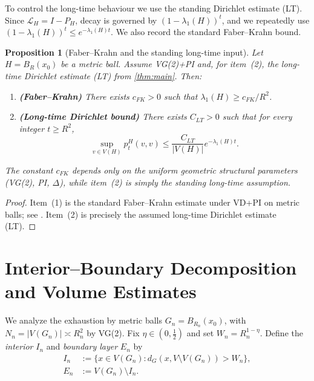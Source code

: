 \documentclass[reqno]{amsart}
\numberwithin{equation}{section}
\newtheorem{proposition}[proposition]{Proposition}
\theoremstyle{definition}
\theoremstyle{remark}
\newcommand{\Cref}[1]{\autoref{#1}}
\newcommand{\LL}{\mathcal{L}}
\begin{document}
To control the long-time behaviour we use the standing Dirichlet estimate (LT). Since $\LL_H=I-P_H$, decay is governed by $(1-\lambda_1(H))^t$, and we repeatedly use $(1-\lambda_1(H))^t\le e^{-\lambda_1(H)t}$. We also record the standard Faber--Krahn bound.

\begin{proposition}[Faber--Krahn and the standing long-time input]\label{prop:LT}
Let $H=B_R(x_0)$ be a metric ball. Assume VG(2)+PI and, for item~\textup{(2)}, the long-time Dirichlet estimate \textup{(LT)} from \Cref{thm:main}. Then:
\begin{enumerate}
    \item \textbf{(Faber--Krahn)} There exists $c_{FK}>0$ such that $\lambda_1(H)\ge c_{FK}/R^{2}$.
    \item \textbf{(Long-time Dirichlet bound)} There exists $C_{LT}>0$ such that for every integer $t\ge R^{2}$,
    \begin{equation}\label{eq:LT}
        \sup_{v \in V(H)} p_t^H(v,v) \leq \frac{C_{LT}}{|V(H)|} e^{-\lambda_1(H) t}.
    \end{equation}
\end{enumerate}
The constant $c_{FK}$ depends only on the uniform geometric structural parameters \textup{(VG(2), PI,} $\Delta$), while item~\textup{(2)} is simply the standing long-time assumption.
\end{proposition}

\begin{proof}
Item~(1) is the standard Faber--Krahn estimate under VD+PI on metric balls; see \cite{Grigoryan09, BarlowBass04}. Item~(2) is precisely the assumed long-time Dirichlet estimate (LT).
\end{proof}

\section{Interior--Boundary Decomposition and Volume Estimates}\label{sec:decomposition}

We analyze the exhaustion by metric balls $G_n = B_{R_n}(x_0)$, with $N_n = |V(G_n)|\asymp R_n^2$ by VG(2). Fix $\eta \in (0, \tfrac{1}{2})$ and set $W_n = R_n^{1-\eta}$. Define the \emph{interior} $I_n$ and \emph{boundary layer} $E_n$ by
\begin{align*}
I_n &:= \{x \in V(G_n) : d_G(x, V \setminus V(G_n)) > W_n\}, \\
E_n &:= V(G_n) \setminus I_n.
\end{align*}
\end{document}
